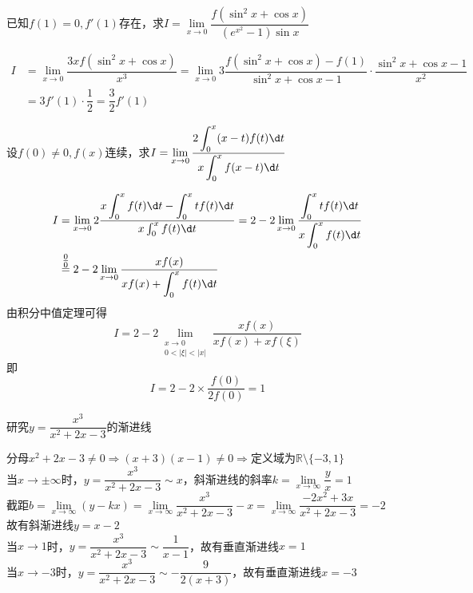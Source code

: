 \documentclass[12pt, a4paper, oneside, UTF8]{ctexbook}
\begin{document}
\begin{exercise}
    已知$f(1)=0,f'(1)$存在，求$I=\lim\limits_{x \to 0}\dfrac{f(\sin^{2} x+\cos x)}{\left( e^{x^{2}}-1\right)\sin x}$
\end{exercise}
\begin{solution}
    \begin{align*}
        I&=\lim\limits_{x \to 0}{\dfrac{3xf(\sin^{2} x+\cos x)}{x^{3}}}
        =\lim\limits_{x \to 0}3\dfrac{f(\sin^{2} x+\cos x)-f(1)}{\sin^{2} x +\cos x -1} \cdot \dfrac{\sin^{2} x+\cos x -1}{x^{2}}\\
        &=3f'(1) \cdot \dfrac{1}{2}= \boxed{\dfrac{3}{2}f'(1)}
    \end{align*}
\end{solution}
\begin{exercise}
    设$f(0)\neq 0,f(x)$连续，求$I=\lim\limits_{x \to 0}\dfrac{2\displaystyle\int_{0}^{x}(x-t)f(t)\d t}{x\displaystyle\int_{0}^{x}f(x-t)\d t}$
\end{exercise}
\begin{solution}
    \begin{align*}
            I&=\lim\limits_{x \to 0} 2\dfrac{x\displaystyle\int_{0}^{x}f(t)\d t-\displaystyle\int_{0}^{x}tf(t)\d t}{x\int_{0}^{x}f(t)\d t}
            =2-2\lim\limits_{x \to 0}\dfrac{\displaystyle\int_{0}^{x}tf(t)\d t}{x\displaystyle\int_{0}^{x}f(t)\d t}\\
            &\overset{\tfrac{0}{0}}{=}2-2\lim\limits_{x \to 0}\dfrac{xf(x)}{x f(x)+\displaystyle\int_{0}^{x}f(t)\d t}\\
    \end{align*}
            由积分中值定理可得
            \[
            I=2-2\lim\limits_{\substack{x \to 0 \\ 0<|\xi|<|x|}}\dfrac{xf(x)}{xf(x)+xf(\xi)}
            \]
            即
            \[
            I=2-2\times \dfrac{f(0)}{2f(0)}=\boxed{1}
            \]
\end{solution}
\begin{exercise}
    研究$y=\dfrac{x^3}{x^2 +2x-3}$的渐进线
\end{exercise}
\begin{solution}
    分母$x^2 +2x-3\neq 0 \Rightarrow (x+3)(x-1) \neq 0 \Rightarrow \text{定义域为} \mathbb{R} \setminus \{-3, 1\}$\\[6pt]
    当$x \to \pm \infty$时，$y=\dfrac{x^3}{x^2 +2x-3} \sim x$，斜渐进线的斜率$k=\lim\limits_{x\to\infty}\dfrac{y}{x}=1$\\[6pt]
    截距$b=\lim\limits_{x\to\infty}(y - kx)=\lim\limits_{x\to\infty}\dfrac{x^3}{x^2 +2x-3} - x = \lim\limits_{x\to\infty}\dfrac{-2x^2 +3x}{x^2 +2x-3} = -2$\\[6pt]
    故有斜渐进线$\boxed{y=x-2}$\\[6pt]
    当$x \to 1$时，$y=\dfrac{x^3}{x^2 +2x-3} \sim \dfrac{1}{x-1}$，故有垂直渐进线$\boxed{x=1}$\\[6pt]
    当$x \to -3$时，$y=\dfrac{x^3}{x^2 +2x-3} \sim -\dfrac{9}{2(x+3)}$，故有垂直渐进线$\boxed{x=-3}$
\end{solution}
\end{document}
